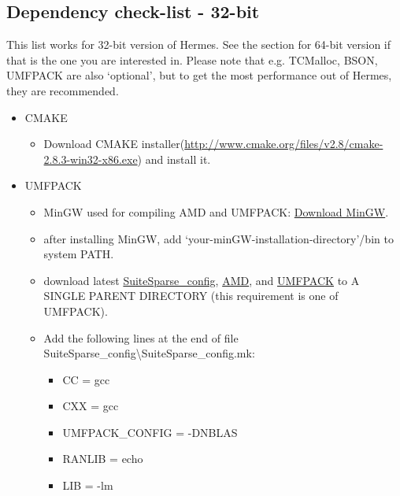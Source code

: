 \documentclass[a4paper,0pt,english]{sphinxmanual}
\begin{document}
\subsection{Dependency check-list - 32-bit}
\label{src/installation/win:dependency-check-list-32-bit}
This list works for 32-bit version of Hermes. See the section for 64-bit version if that is the one you are interested in.
Please note that e.g. TCMalloc, BSON, UMFPACK are also `optional', but to get the most performance out of Hermes, they are recommended.
\begin{itemize}
\item {} 
CMAKE
\begin{itemize}
\item {} 
Download CMAKE installer(\href{http://www.cmake.org/files/v2.8/cmake-2.8.3-win32-x86.exe}{http://www.cmake.org/files/v2.8/cmake-2.8.3-win32-x86.exe}) and install it.

\end{itemize}

\item {} 
UMFPACK
\begin{itemize}
\item {} 
MinGW used for compiling AMD and UMFPACK: \href{http://sourceforge.net/projects/mingw/}{Download MinGW}.

\item {} 
after installing MinGW, add `your-minGW-installation-directory'/bin to system PATH.

\item {} 
download latest \href{http://www.cise.ufl.edu/research/sparse/SuiteSparse\_config/}{SuiteSparse\_config}, \href{http://www.cise.ufl.edu/research/sparse/amd/}{AMD}, and \href{http://www.cise.ufl.edu/research/sparse/umfpack/}{UMFPACK} to  A SINGLE PARENT DIRECTORY (this requirement is one of UMFPACK).

\item {} 
Add the following lines at the end of file SuiteSparse\_config\textbackslash{}SuiteSparse\_config.mk:
\begin{itemize}
\item {} 
CC = gcc

\item {} 
CXX = gcc

\item {} 
UMFPACK\_CONFIG = -DNBLAS

\item {} 
RANLIB = echo

\item {} 
LIB = -lm


\end{itemize}
\end{itemize}
\end{itemize}
\end{document}
